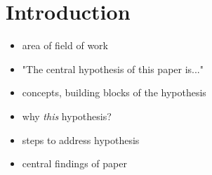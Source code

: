 \section{Introduction}

\begin{itemize}
  \item area of field of work
  \item "The central hypothesis of this paper is..."
  \item concepts, building blocks of the hypothesis
  \item why \emph{this} hypothesis?
  \item steps to address hypothesis
  \item central findings of paper
\end{itemize}